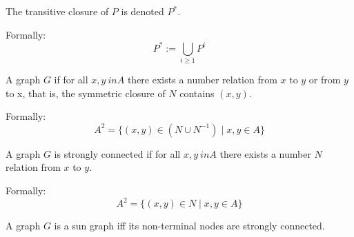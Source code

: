 \begin{definition}
\begin{subdefinition}
    The transitive closure of \(P\) is denoted \(P^*\).

    Formally:
    \[
        P^* := \bigcup_{i \geq 1} P^i
    \]
    \label{def:rel-star} %
\end{subdefinition}
\end{definition}

\begin{definition}
    \begin{subdefinition}
        A graph \(G\) if for all \(x, y \ in A\) there exists a number relation from \(x\) to \(y\) or from \(y\) to x, that is, the symmetric closure of \(N\) contains \((x, y)\).
        
        Formally: 
            \[
                A^2 = \{ (x, y) \in (N \cup N^{-1}) \mid x, y \in A \}
            \]
        \label{def:weakly-connected}
    \end{subdefinition}
    
    \begin{subdefinition}
        A graph \(G\) is strongly connected if for all \(x, y \ in A\) there exists a number \(N\) relation from \(x\) to \(y\).
        
        Formally:
            \[
                A^2 = \{ (x, y) \in N \mid x, y \in A \}
            \]
        \label{def:strongly-connected}
    \end{subdefinition}
    
    \begin{subdefinition}
        A graph \(G\) is a sun graph iff its non-terminal nodes are strongly connected.
        \label{def:sun-graph}
    \end{subdefinition}
\end{definition}


